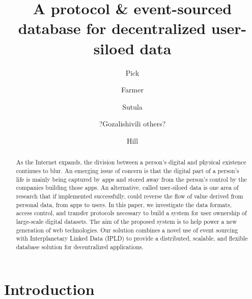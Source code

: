 \documentclass{textile}
\begin{document}
\pagecolor{white}

\title[Textile Threads]{A protocol \& event-sourced database for decentralized user-siloed data}
\author{Pick}
\author{Farmer}
\author{Sutula}
 
\author{?Gozalishivili others?}
 
\author{Hill}
 






\begin{abstract}
As the Internet expands, the division between a person's digital and physical existence continues to blur. An emerging issue of concern is that the digital part of a person's life is mainly being captured by apps and stored away from the person's control by the companies building those apps. An alternative, called user-siloed data is one area of research that if implemented successfully, could reverse the flow of value derived from personal data, from apps to users. In this paper, we investigate the data formats, access control, and transfer protocols necessary to build a system for user ownership of large-scale digital datasets. The aim of the proposed system is to help power a new generation of web technologies. Our solution combines a novel use of event sourcing with Interplanetary Linked Data (IPLD) to provide a distributed, scalable, and flexible database solution for decentralized applications.
\end{abstract}

\maketitle

\section{Introduction}
\end{document}
